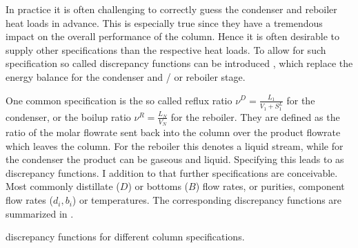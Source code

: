         In practice it is often challenging to correctly guess the condenser and reboiler heat loads in
        advance. This is especially true since they have a tremendous impact on the overall performance
        of the column. Hence it is often desirable to supply other specifications than the respective
        heat loads. To allow for such specification so called discrepancy functions can be introduced \cite{Henley.op.2011},
        which replace the energy balance for the condenser and / or reboiler stage.

        One common specification is the so called reflux ratio $\nu^D = \frac{L_1}{V_1 + S_1^L}$ for
        the condenser, or the boilup ratio $\nu^R = \frac{L_N}{V_N}$ for the reboiler.
        They are defined as the ratio of the molar flowrate sent back into the column over the
        product flowrate which leaves the column. For the reboiler this denotes a liquid stream,
        while for the condenser the product can be gaseous and liquid. Specifying this leads to
        as discrepancy functions. I addition to that further specifications are conceivable. Most
        commonly distillate ($D$) or bottoms ($B$) flow rates, or purities, component flow rates ($d_i, b_i$)
        or temperatures. The corresponding discrepancy functions are summarized in .

        \begin{table}
            \centering
            \footnotesize
            
            \caption{discrepancy functions for different column specifications.}
            \label{tab:discrepancy}
        \end{table}

